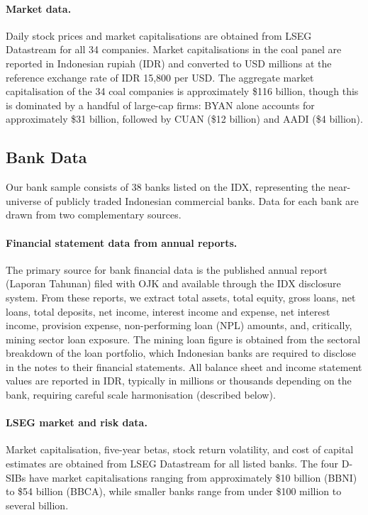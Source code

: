 \paragraph{Market data.} Daily stock prices and market capitalisations are obtained from LSEG Datastream for all 34 companies. Market capitalisations in the coal panel are reported in Indonesian rupiah (IDR) and converted to USD millions at the reference exchange rate of IDR 15,800 per USD. The aggregate market capitalisation of the 34 coal companies is approximately \$116 billion, though this is dominated by a handful of large-cap firms: BYAN alone accounts for approximately \$31 billion, followed by CUAN (\$12 billion) and AADI (\$4 billion).


\subsection{Bank Data}
\label{subsec:bank_data}

Our bank sample consists of 38 banks listed on the IDX, representing the near-universe of publicly traded Indonesian commercial banks. Data for each bank are drawn from two complementary sources.

\paragraph{Financial statement data from annual reports.} The primary source for bank financial data is the published annual report (Laporan Tahunan) filed with OJK and available through the IDX disclosure system. From these reports, we extract total assets, total equity, gross loans, net loans, total deposits, net income, interest income and expense, net interest income, provision expense, non-performing loan (NPL) amounts, and, critically, mining sector loan exposure. The mining loan figure is obtained from the sectoral breakdown of the loan portfolio, which Indonesian banks are required to disclose in the notes to their financial statements. All balance sheet and income statement values are reported in IDR, typically in millions or thousands depending on the bank, requiring careful scale harmonisation (described below).



\paragraph{LSEG market and risk data.} Market capitalisation, five-year betas, stock return volatility, and cost of capital estimates are obtained from LSEG Datastream for all listed banks. The four D-SIBs have market capitalisations ranging from approximately \$10 billion (BBNI) to \$54 billion (BBCA), while smaller banks range from under \$100 million to several billion.

